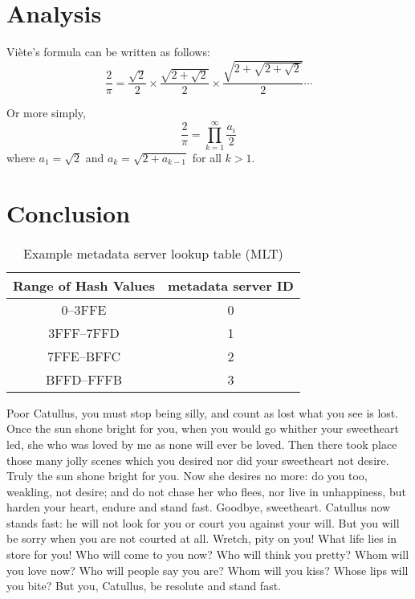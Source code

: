 \documentclass[12pt]{article}
\begin{document}
\section{Analysis}\label{analysis}

Vi\`{e}te's formula can be written as follows:
\[
  \frac{2}{\pi} = \frac{\sqrt{2}}{2} \times \frac{\sqrt{2 +
  \sqrt{2}}}{2} \times \frac{\sqrt{2 + \sqrt{2 + \sqrt{2}}}}{2} \cdots
\]

Or more simply,
\[
  \frac{2}{\pi} = \prod_{k=1}^{\infty} \frac{a_i}{2}
\]
where $a_1 = \sqrt{2}$ and $a_k = \sqrt{2 + a_{k-1}}$ for all $k > 1$.

\section{Conclusion}

\begin{table}[btp]
\centering
\caption{Example metadata server lookup table (MLT)}
\label{table:mlt}
\medskip
\begin{tabular}{cc}
\toprule
 Range of Hash Values & metadata server ID\\
 \midrule
 0--3FFE & 0\\
 3FFF--7FFD & 1\\
 7FFE--BFFC & 2\\
 BFFD--FFFB & 3\\
 \bottomrule
\end{tabular}
\end{table}

Poor Catullus, you must stop being silly,
and count as lost what you see is lost.
Once the sun shone bright for you,
when you would go whither your sweetheart led,
she who was loved by me as none will ever be loved.
Then there took place those many jolly scenes
which you desired nor did your sweetheart not desire.
Truly the sun shone bright for you.
Now she desires no more: do you too, weakling, not desire;
and do not chase her who flees, nor live in unhappiness,
but harden your heart, endure and stand fast.
Goodbye, sweetheart. Catullus now stands fast:
he will not look for you or court you against your will.
But you will be sorry when you are not courted at all.
Wretch, pity on you! What life lies in store for you!
Who will come to you now? Who will think you pretty?
Whom will you love now? Who will people say you are?
Whom will you kiss? Whose lips will you bite?
But you, Catullus, be resolute and stand fast.
\end{document}

